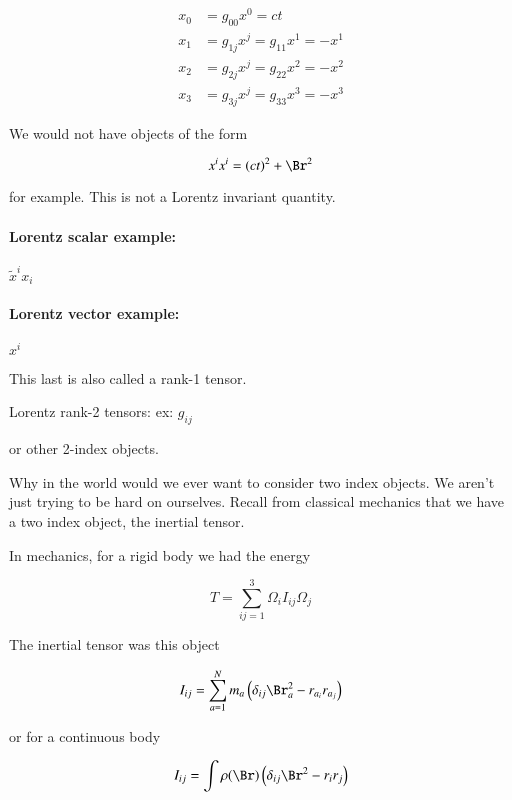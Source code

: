\begin{align*}
x_0 &= g_{0 0} x^0 = ct  \\
x_1 &= g_{1 j} x^j = g_{11} x^1 = -x^1 \\
x_2 &= g_{2 j} x^j = g_{22} x^2 = -x^2 \\
x_3 &= g_{3 j} x^j = g_{33} x^3 = -x^3
\end{align*}

We would not have objects of the form 

\begin{equation}\label{eqn:relativisticElectrodynamicsL6:190}
x^i x^i = (ct)^2 + \Br^2
\end{equation}

for example.  This is not a Lorentz invariant quantity.

\paragraph{Lorentz scalar example:} $\tilde{x}^i x_i$
\paragraph{Lorentz vector example:} $x^i$

This last is also called a rank-1 tensor.

Lorentz rank-2 tensors: ex: $g_{ij}$

or other 2-index objects.

Why in the world would we ever want to consider two index objects.  We aren't just trying to be hard on ourselves.  Recall from classical mechanics that we have a two index object, the inertial tensor.

In mechanics, for a rigid body we had the energy

\begin{equation}\label{eqn:relativisticElectrodynamicsL6:200}
T = \sum_{ij = 1}^3 \Omega_i I_{ij} \Omega_j
\end{equation}

The inertial tensor was this object 

\begin{equation}\label{eqn:relativisticElectrodynamicsL6:210}
I_{ij} = \sum_{a = 1}^N m_a \left(\delta_{ij} \Br_a^2 - r_{a_i} r_{a_j} \right)
\end{equation}

or for a continuous body

\begin{equation}\label{eqn:relativisticElectrodynamicsL6:220}
I_{ij} = \int \rho(\Br) \left(\delta_{ij} \Br^2 - r_{i} r_{j} \right)
\end{equation}

